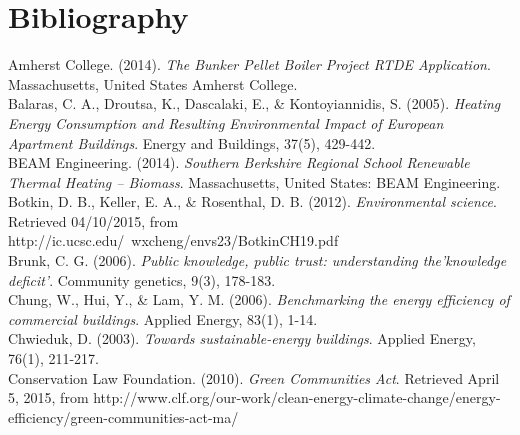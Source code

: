 
\newpage
\chapter*{Bibliography}
\setlength{\parindent}{0pt}

\hangindent=0.5in
Amherst College. (2014). \emph{The Bunker Pellet Boiler Project RTDE Application}. Massachusetts, United States Amherst College. \\

\hangindent=0.5in
Balaras, C. A., Droutsa, K., Dascalaki, E., \& Kontoyiannidis, S. (2005). \emph{Heating Energy Consumption and Resulting Environmental Impact of European Apartment Buildings}. Energy and Buildings, 37(5), 429-442. \\

\hangindent=0.5in
BEAM Engineering. (2014). \emph{Southern Berkshire Regional School Renewable Thermal Heating – Biomass}. Massachusetts, United States: BEAM Engineering. \\

\hangindent=0.5in
Botkin, D. B., Keller, E. A., \& Rosenthal, D. B. (2012). \emph{Environmental science}. Retrieved 04\slash 10\slash 2015, from http:\slash \slash ic.ucsc.edu\slash ~wxcheng\slash envs23\slash BotkinCH19.pdf \\

\hangindent=0.5in
Brunk, C. G. (2006). \emph{Public knowledge, public trust: understanding the'knowledge deficit'}. Community genetics, 9(3), 178-183. \\

\hangindent=0.5in
Chung, W., Hui, Y., \& Lam, Y. M. (2006). \emph{Benchmarking the energy efficiency of commercial buildings}. Applied Energy, 83(1), 1-14. \\

\hangindent=0.5in
Chwieduk, D. (2003). \emph{Towards sustainable-energy buildings}. Applied Energy, 76(1), 211-217. \\

\hangindent=0.5in
Conservation Law Foundation. (2010). \emph{Green Communities Act}. Retrieved April 5, 2015, from http:\slash \slash www.clf.org\slash our-work\slash clean-energy-climate-change\slash energy-efficiency\slash green-communities-act-ma\slash  \\

